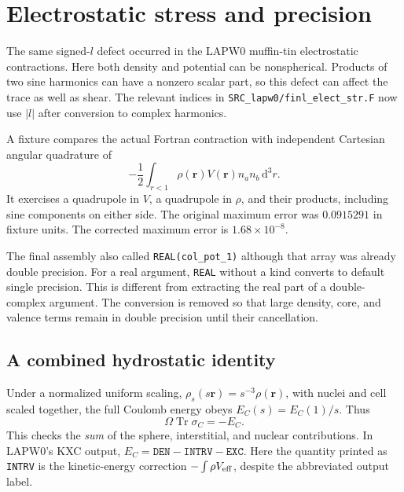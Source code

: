 \documentclass[11pt]{article}
\newcommand{\Tr}{\operatorname{Tr}}
\newcommand{\dd}{\mathrm d}
\begin{document}
\section{Electrostatic stress and precision}
The same signed-$l$ defect occurred in the LAPW0 muffin-tin electrostatic contractions. Here both density and potential can be nonspherical. Products of two sine harmonics can have a nonzero scalar part, so this defect can affect the trace as well as shear. The relevant indices in \nolinkurl{SRC_lapw0/finl_elect_str.F} now use $|l|$ after conversion to complex harmonics.

A fixture compares the actual Fortran contraction with independent Cartesian angular quadrature of
\begin{equation}
 -\frac12\int_{r<1}\rho(\bm r)V(\bm r)n_an_b\,\dd^3r.
\end{equation}
It exercises a quadrupole in $V$, a quadrupole in $\rho$, and their products, including sine components on either side. The original maximum error was $0.0915291$ in fixture units. The corrected maximum error is $1.68\times10^{-8}$.

The final assembly also called \texttt{REAL(col\_pot\_1)} although that array was already double precision. For a real argument, \texttt{REAL} without a kind converts to default single precision. This is different from extracting the real part of a double-complex argument. The conversion is removed so that large density, core, and valence terms remain in double precision until their cancellation.

\subsection{A combined hydrostatic identity}
Under a normalized uniform scaling, $\rho_s(s\bm r)=s^{-3}\rho(\bm r)$, with nuclei and cell scaled together, the full Coulomb energy obeys $E_C(s)=E_C(1)/s$. Thus
\begin{equation}\label{eq:coultrace}
 \boxed{\Omega\Tr\sigma_C=-E_C.}
\end{equation}
This checks the \emph{sum} of the sphere, interstitial, and nuclear contributions. In LAPW0's KXC output, $E_C=\texttt{DEN}-\texttt{INTRV}-\texttt{EXC}$. Here the quantity printed as \texttt{INTRV} is the kinetic-energy correction $-\int\rho V_{\rm eff}$, despite the abbreviated output label.
\end{document}
